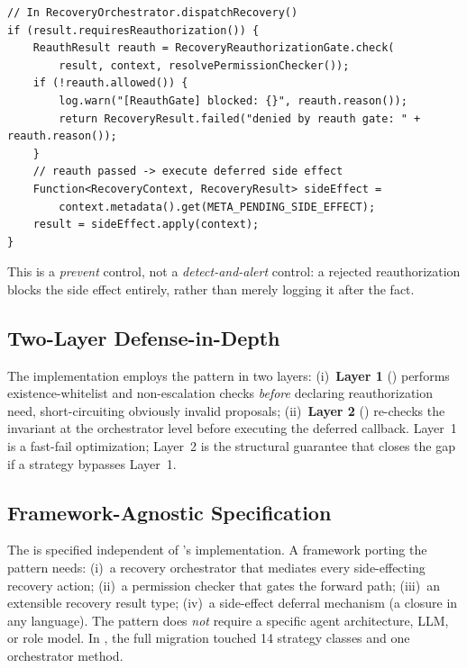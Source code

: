 \begin{lstlisting}[caption={\reauthgate{} in \code{RecoveryOrchestrator}.},label={lst:reauthgate}]
// In RecoveryOrchestrator.dispatchRecovery()
if (result.requiresReauthorization()) {
    ReauthResult reauth = RecoveryReauthorizationGate.check(
        result, context, resolvePermissionChecker());
    if (!reauth.allowed()) {
        log.warn("[ReauthGate] blocked: {}", reauth.reason());
        return RecoveryResult.failed("denied by reauth gate: " + reauth.reason());
    }
    // reauth passed -> execute deferred side effect
    Function<RecoveryContext, RecoveryResult> sideEffect =
        context.metadata().get(META_PENDING_SIDE_EFFECT);
    result = sideEffect.apply(context);
}
\end{lstlisting}

This is a \emph{prevent} control, not a \emph{detect-and-alert} control: a rejected reauthorization blocks the side effect entirely, rather than merely logging it after the fact.

\subsection{Two-Layer Defense-in-Depth}
\label{sec:layered-defense}

The implementation employs the pattern in two layers: (i)~\textbf{Layer 1} () performs existence-whitelist and non-escalation checks \emph{before} declaring reauthorization need, short-circuiting obviously invalid proposals; (ii)~\textbf{Layer 2} () re-checks the invariant at the orchestrator level before executing the deferred callback. Layer~1 is a fast-fail optimization; Layer~2 is the structural guarantee that closes the gap if a strategy bypasses Layer~1.

\subsection{Framework-Agnostic Specification}
\label{sec:pattern-spec}

The \reauthgate{} is specified independent of \system{}'s implementation. A framework porting the pattern needs: (i)~a recovery orchestrator that mediates every side-effecting recovery action; (ii)~a permission checker that gates the forward path; (iii)~an extensible recovery result type; (iv)~a side-effect deferral mechanism (a closure in any language). The pattern does \emph{not} require a specific agent architecture, LLM, or role model. In \system{}, the full migration touched 14 strategy classes and one orchestrator method.
